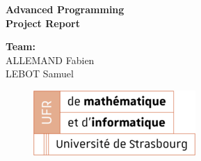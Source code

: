 \documentclass{article}
\begin{document}
\thispagestyle{empty}
\addtocounter{page}{-1}
\begin{center}
	\baselineskip=50pt
	\vspace*{1cm}
	\textbf{{\Huge Advanced Programming}}\\
	\vspace*{0.25cm}
	\textbf{{\Huge Project Report}}\\
	\vspace*{0.25cm}
	\begin{minipage}[c]{.46\linewidth}
        \centering
        \textbf{Team:}\\
		ALLEMAND Fabien\\
        LEBOT Samuel
    \end{minipage}
\end{center}
\vspace*{0.1cm}

\begin{figure}[H]
\centering
\centerline{\includegraphics[scale=1.]{img/logo_UFR_2.png}}
\end{figure}


\newpage
\tableofcontents

\newpage
{}
\listoffigures

\newpage
{}








\newpage
{}


\end{document}
